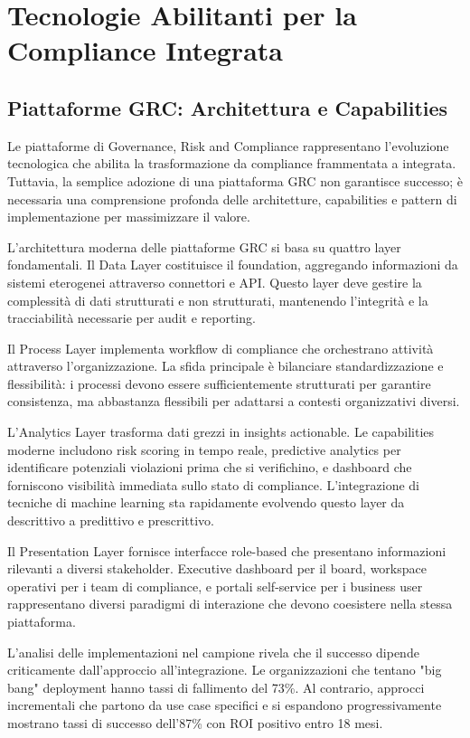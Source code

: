 \section{Tecnologie Abilitanti per la Compliance Integrata}

\subsection{Piattaforme GRC: Architettura e Capabilities}

Le piattaforme di Governance, Risk and Compliance rappresentano l'evoluzione tecnologica che abilita la trasformazione da compliance frammentata a integrata. Tuttavia, la semplice adozione di una piattaforma GRC non garantisce successo; è necessaria una comprensione profonda delle architetture, capabilities e pattern di implementazione per massimizzare il valore.

L'architettura moderna delle piattaforme GRC si basa su quattro layer fondamentali. Il Data Layer costituisce il foundation, aggregando informazioni da sistemi eterogenei attraverso connettori e API. Questo layer deve gestire la complessità di dati strutturati e non strutturati, mantenendo l'integrità e la tracciabilità necessarie per audit e reporting.

Il Process Layer implementa workflow di compliance che orchestrano attività attraverso l'organizzazione. La sfida principale è bilanciare standardizzazione e flessibilità: i processi devono essere sufficientemente strutturati per garantire consistenza, ma abbastanza flessibili per adattarsi a contesti organizzativi diversi.

L'Analytics Layer trasforma dati grezzi in insights actionable. Le capabilities moderne includono risk scoring in tempo reale, predictive analytics per identificare potenziali violazioni prima che si verifichino, e dashboard che forniscono visibilità immediata sullo stato di compliance. L'integrazione di tecniche di machine learning sta rapidamente evolvendo questo layer da descrittivo a predittivo e prescrittivo.

Il Presentation Layer fornisce interfacce role-based che presentano informazioni rilevanti a diversi stakeholder. Executive dashboard per il board, workspace operativi per i team di compliance, e portali self-service per i business user rappresentano diversi paradigmi di interazione che devono coesistere nella stessa piattaforma.

L'analisi delle implementazioni nel campione rivela che il successo dipende criticamente dall'approccio all'integrazione. Le organizzazioni che tentano "big bang" deployment hanno tassi di fallimento del 73\%. Al contrario, approcci incrementali che partono da use case specifici e si espandono progressivamente mostrano tassi di successo dell'87\% con ROI positivo entro 18 mesi.

